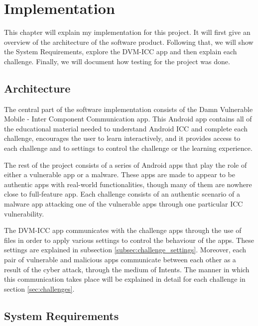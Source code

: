 \chapter{Implementation}
    \label{chap:implementation}

   This chapter will explain my implementation for this project. It will first give an overview of the architecture of the software product. Following that, we will show the System Requirements, explore the DVM-ICC app and then explain each challenge. Finally, we will document how testing for the project was done.

    \section{Architecture} 
        \label{sec:architecture}
        
    The central part of the software implementation consists of the Damn Vulnerable Mobile - Inter Component Communication app. This Android app contains all of the educational material needed to understand Android ICC and complete each challenge, encourages the user to learn interactively,  and it provides access to each challenge and to settings to control the challenge or the learning experience. 
    
    The rest of the project consists of a series of Android apps that play the role of either a vulnerable app or a malware. These apps are made to appear to be authentic apps with real-world functionalities, though many of them are nowhere close to full-feature app. Each challenge consists of an authentic scenario of a malware app attacking one of the vulnerable apps through one particular ICC vulnerability.
    
    The DVM-ICC app communicates with the challenge apps through the use of files in order to apply various settings to control the behaviour of the apps. These settings are explained in subsection \ref{subsec:challenge_settings}. Moreover, each pair of vulnerable and malicious apps communicate between each other as a result of the cyber attack, through the medium of Intents. The manner in which this communication takes place will be explained in detail for each challenge in section \ref{sec:challenges}.
    
    \section{System Requirements}
    \label{sec:requirements}


